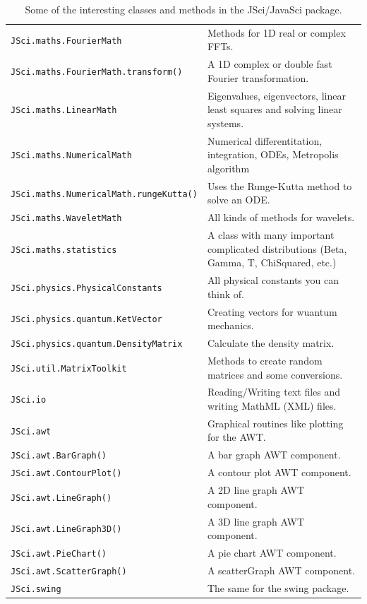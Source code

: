 \begin{table}
\begin{center}
\begin{tabular}{ll}
\verb|JSci.maths.FourierMath| & Methods for 1D real or complex FFTs.\\
\verb|JSci.maths.FourierMath.transform()| & A 1D complex or double fast 
        Fourier transformation.\\\hline
\verb|JSci.maths.LinearMath| & Eigenvalues, eigenvectors, linear least squares
           and solving linear systems.\\\hline
\verb|JSci.maths.NumericalMath| &  Numerical differentitation, integration, 
        ODEs, Metropolis algorithm \\
\verb|JSci.maths.NumericalMath.rungeKutta()| & Uses the Runge-Kutta 
              method to solve an ODE.\\\hline
\verb|JSci.maths.WaveletMath| & All kinds of methods for wavelets.\\\hline
\verb|JSci.maths.statistics| & A class with many important complicated 
              distributions (Beta, Gamma, T, ChiSquared, etc.)\\\hline
\verb|JSci.physics.PhysicalConstants| & All physical constants you 
                               can think of.\\\hline
\verb|JSci.physics.quantum.KetVector| & Creating vectors for wuantum 
             mechanics.\\
\verb|JSci.physics.quantum.DensityMatrix| & Calculate the density matrix.\\\hline
\verb|JSci.util.MatrixToolkit| & Methods to create random matrices 
                 and some conversions.\\\hline
\verb|JSci.io| & Reading/Writing text files and writing MathML (XML) files.\\\hline
\verb|JSci.awt| & Graphical routines like plotting for the AWT.\\
\verb|JSci.awt.BarGraph()| & A bar graph AWT component. \\
\verb|JSci.awt.ContourPlot()| & A contour plot AWT component. \\
\verb|JSci.awt.LineGraph()| & A 2D line graph AWT component. \\
\verb|JSci.awt.LineGraph3D()| & A 3D line graph AWT component. \\
\verb|JSci.awt.PieChart()| & A pie chart AWT component. \\
\verb|JSci.awt.ScatterGraph()| & A scatterGraph AWT component. \\\hline
\verb|JSci.swing| & The same for the swing package.\\
     \end{tabular}
    \caption{Some of the interesting classes and methods in %
      the JSci/JavaSci package.}
    \label{tab:JSciClasses}
  \end{center}
\end{table}
